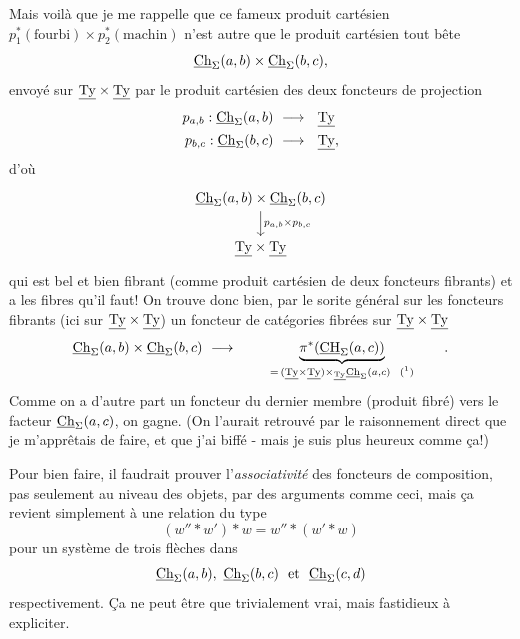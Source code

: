Mais voilà que je me rappelle que ce fameux produit cartésien $p_1^*(\text{fourbi})\times p_2^*(\text{machin})$ n'est autre que le produit cartésien tout bête
\[
\underline{\mathrm{Ch}}_{\Sigma}(a,b)\times\underline{\mathrm{Ch}}_{\Sigma}(b,c),
\]
envoyé sur $\underline{\mathrm{Ty}}\times\underline{\mathrm{Ty}}$ par le produit cartésien des deux foncteurs de projection
\[
\begin{aligned}
p_{a,b} : \underline{\mathrm{Ch}}_{\Sigma}(a,b) &\ \longrightarrow\ \ \underline{\mathrm{Ty}}\\
p_{b,c} : \underline{\mathrm{Ch}}_{\Sigma}(b,c) &\ \longrightarrow\ \ \underline{\mathrm{Ty}},
\end{aligned}
\]
d'où
\[
\begin{tikzcd}
\Ch_{\Sigma}(a,b)\times\Ch_{\Sigma}(b,c) \ar[d,"p_{a,b}\times p_{b,c}"] \\
\Ty\times\Ty
\end{tikzcd}
\]
qui est bel et bien fibrant (comme produit cartésien de deux foncteurs fibrants) et a les fibres qu'il faut! On trouve donc bien, par le sorite général sur les foncteurs fibrants (ici sur $\underline{\mathrm{Ty}}\times\underline{\mathrm{Ty}}$) un foncteur de catégories fibrées sur $\underline{\mathrm{Ty}}\times\underline{\mathrm{Ty}}$
\[
\Ch_{\Sigma}(a,b)\times\Ch_{\Sigma}(b,c) \ \longrightarrow\ \qquad \underbrace{\pi^*(\CH_{\Sigma}(a,c))}_{=\,(\Ty\times\Ty)\times_{\Ty}\Ch_{\Sigma}(a,c)\ \ \text{(\footnotemark)}} \qquad .
\]
Comme on a d'autre part un foncteur du dernier membre (produit fibré) vers le facteur $\underline{\mathrm{Ch}}_{\Sigma}(a,c)$, on gagne. (On l'aurait retrouvé par le raisonnement direct que je m'apprêtais de faire, et que j'ai biffé - mais je suis plus heureux comme ça!)

Pour bien faire, il faudrait prouver l'\textit{associativité} des foncteurs de composition, pas seulement au niveau des objets, par des arguments comme ceci, mais ça revient simplement à une relation du type
\[
(w''*w')*w = w''*(w'*w)
\]
pour un système de trois flèches dans
\[
\Ch_{\Sigma}(a,b),\ \Ch_{\Sigma}(b,c)\ \ \text{et}\ \ \Ch_{\Sigma}(c,d)
\]
respectivement. Ça ne peut être que trivialement
vrai, mais fastidieux à expliciter.

